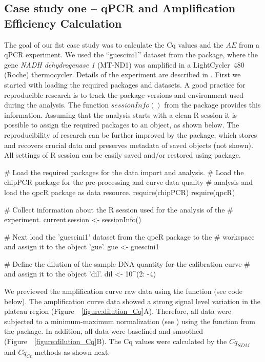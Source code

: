 \subsection{Case study one -- qPCR and Amplification Efficiency Calculation}

The goal of our fist case study was to calculate the Cq values and the $AE$ from 
a qPCR experiment. We used the ``guescini1'' dataset from the  
package, where the gene \textit{NADH dehydrogenase 1} (MT-ND1) was amplified in 
a LightCycler\circledR~480 (Roche) thermocycler. Details of the experiment are 
described in \citet{guescini_2008}. First we started with loading the required 
packages and datasets. A good practice for reproducible research is to track the 
package versions and environment used during the analysis. The function 
$sessionInfo()$ from the  package provides this information. 
Assuming that the analysis starts with a clean R session it is possible to 
assign the required packages to an object, as shown below. The reproducibility 
of research can be further improved by the  package, which 
stores and recovers crucial data and preserves metadata of saved objects (not 
shown). All settings of R session can be easily saved and/or restored using 
 package.

\begin{example}
# Load the required packages for the data import and analysis.
# Load the chipPCR package for the pre-processing and curve data quality
# analysis and load the qpcR package as data resource.
require(chipPCR)
require(qpcR)

# Collect information about the R session used for the analysis of the
# experiment.
current.session <- sessionInfo()

# Next load the 'guescini1' dataset from the qpcR package to the
# workspace and assign it to the object 'gue'.
gue <- guescini1

# Define the dilution of the sample DNA quantity for the calibration curve 
# and assign it to the object 'dil'.
dil <- 10^(2: -4)
\end{example}

We previewed the amplification curve raw data using the  
function (see code below). The amplification curve data showed a strong signal 
level variation in the plateau region (Figure~~\ref{figure:dilution_Cq}A). 
Therefore, all data were subjected to a minimum-maximum normalization (see 
\citet{roediger_RJ_2013}) using the  function from the 
 package. In addition, all data were baselined and smoothed 
(Figure~~\ref{figure:dilution_Cq}B). The Cq values were calculated by the 
$Cq_{SDM}$ and $Cq_{Ct}$ methods as shown next.

